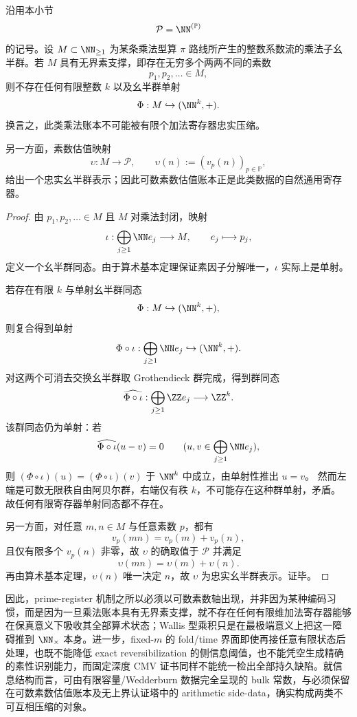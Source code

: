 \begin{theorem}\label{thm:conclusion-unbounded-prime-support-no-finite-register-embedding}
沿用本小节
\[
\mathcal P=\NN^{(\mathbb P)}
\]
的记号。设 \(M\subset\NN_{\ge 1}\) 为某条乘法型算 \(\pi\) 路线所产生的整数系数流的乘法子幺半群。若 \(M\) 具有无界素支撑，即存在无穷多个两两不同的素数
\[
p_1,p_2,\dots \in M,
\]
则不存在任何有限整数 \(k\) 以及幺半群单射
\[
\Phi:M\hookrightarrow (\NN^k,+).
\]
换言之，此类乘法账本不可能被有限个加法寄存器忠实压缩。

另一方面，素数估值映射
\[
\upsilon:M\to\mathcal P,
\qquad
\upsilon(n):=(v_p(n))_{p\in\mathbb P},
\]
给出一个忠实幺半群表示；因此可数素数估值账本正是此类数据的自然通用寄存器。
\end{theorem}
\begin{proof}
由 \(p_1,p_2,\dots\in M\) 且 \(M\) 对乘法封闭，映射
\[
\iota:\bigoplus_{j\ge 1}\NN e_j\longrightarrow M,
\qquad
e_j\longmapsto p_j,
\]
定义一个幺半群同态。由于算术基本定理保证素因子分解唯一，\(\iota\) 实际上是单射。

若存在有限 \(k\) 与单射幺半群同态
\[
\Phi:M\hookrightarrow(\NN^k,+),
\]
则复合得到单射
\[
\Phi\circ\iota:\bigoplus_{j\ge 1}\NN e_j\hookrightarrow (\NN^k,+).
\]
对这两个可消去交换幺半群取 Grothendieck 群完成，得到群同态
\[
\widehat{\Phi\circ\iota}:\bigoplus_{j\ge 1}\ZZ e_j\longrightarrow \ZZ^k.
\]
该群同态仍为单射：若
\[
\widehat{\Phi\circ\iota}(u-v)=0
\qquad
(u,v\in \bigoplus_{j\ge 1}\NN e_j),
\]
则 \((\Phi\circ\iota)(u)=(\Phi\circ\iota)(v)\) 于 \(\NN^k\) 中成立，由单射性推出 \(u=v\)。
然而左端是可数无限秩自由阿贝尔群，右端仅有秩 \(k\)，不可能存在这种群单射，矛盾。
故任何有限寄存器单射同态都不存在。

另一方面，对任意 \(m,n\in M\) 与任意素数 \(p\)，都有
\[
v_p(mn)=v_p(m)+v_p(n),
\]
且仅有限多个 \(v_p(n)\) 非零，故 \(\upsilon\) 的确取值于 \(\mathcal P\) 并满足
\[
\upsilon(mn)=\upsilon(m)+\upsilon(n).
\]
再由算术基本定理，\(\upsilon(n)\) 唯一决定 \(n\)，故 \(\upsilon\) 为忠实幺半群表示。证毕。
\end{proof}






\noindent
因此，prime-register 机制之所以必须以可数素数轴出现，并非因为某种编码习惯，而是因为一旦乘法账本具有无界素支撑，就不存在任何有限维加法寄存器能够在保真意义下吸收其全部算术状态；Wallis 型乘积只是在最极端意义上把这一障碍推到 \(\NN_{\times}\) 本身。进一步，fixed-\(m\) 的 fold/time 界面即使再接任意有限状态后处理，也既不能降低 exact reversibilization 的侧信息阈值，也不能凭空生成精确的素性识别能力，而固定深度 CMV 证书同样不能统一检出全部持久缺陷。就信息结构而言，可由有限容量/Wedderburn 数据完全呈现的 bulk 常数，与必须保留在可数素数估值账本及无上界认证塔中的 arithmetic side-data，确实构成两类不可互相压缩的对象。

\endinput
